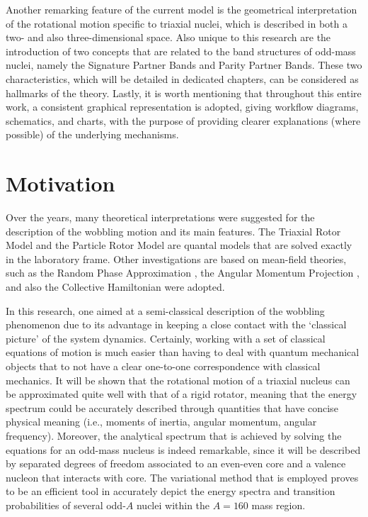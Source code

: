 Another remarking feature of the current model is the geometrical interpretation of the rotational motion specific to triaxial nuclei, which is described in both a two- and also three-dimensional space. Also unique to this research are the introduction of two concepts that are related to the band structures of odd-mass nuclei, namely the Signature Partner Bands and Parity Partner Bands. These two characteristics, which will be detailed in dedicated chapters, can be considered as hallmarks of the theory. Lastly, it is worth mentioning that throughout this entire work, a consistent graphical representation is adopted, giving workflow diagrams, schematics, and charts, with the purpose of providing clearer explanations (where possible) of the underlying mechanisms.

\section{Motivation}

Over the years, many theoretical interpretations were suggested for the description of the wobbling motion and its main features. The Triaxial Rotor Model \cite{bohr1998nuclear,davydov1958rotational} and the Particle Rotor Model \cite{hamamoto2002wobbling} are quantal models that are solved exactly in the laboratory frame. Other investigations are based on mean-field theories, such as the Random Phase Approximation \cite{shimizu1995nuclear}, the Angular Momentum Projection \cite{oi2000wobbling}, and also the Collective Hamiltonian \cite{chen2014collective} were adopted.

In this research, one aimed at a semi-classical description of the wobbling phenomenon due to its advantage in keeping a close contact with the `classical picture' of the system dynamics. Certainly, working with a set of classical equations of motion is much easier than having to deal with quantum mechanical objects that to not have a clear one-to-one correspondence with classical mechanics. It will be shown that the rotational motion of a triaxial nucleus can be approximated quite well with that of a rigid rotator, meaning that the energy spectrum could be accurately described through quantities that have concise physical meaning (i.e., moments  of inertia, angular momentum, angular frequency). Moreover, the analytical spectrum that is achieved by solving the equations for an odd-mass nucleus is indeed remarkable, since it will be described by separated degrees of freedom associated to an even-even core and a valence nucleon that interacts with core. The variational method that is employed proves to be an efficient tool in accurately depict the energy spectra and transition probabilities of several odd-$A$ nuclei within the $A=160$ mass region.

